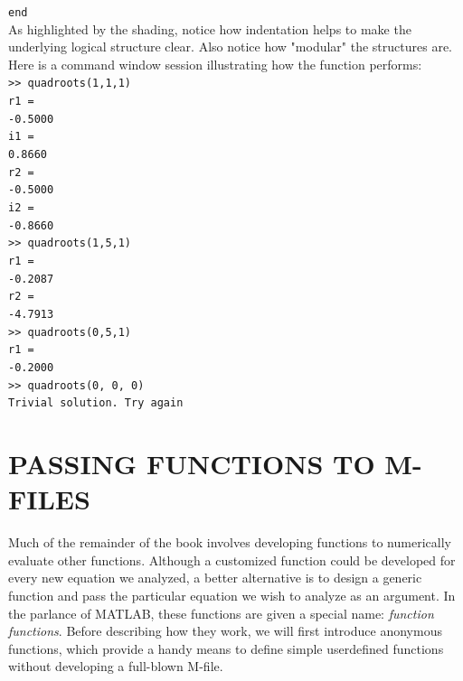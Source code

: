 \documentclass[../main.tex]{subfiles}
\begin{document}
\begin{example}
    \texttt{end}\\

    As highlighted by the shading, notice how indentation helps to make the underlying
logical structure clear. Also notice how "modular" the structures are. Here is a command
window session illustrating how the function performs:\\

\texttt{>> quadroots(1,1,1)\\
\indent r1 =\\
\indent \hspace{2mm}-0.5000\\
\indent i1 =\\
\indent \hspace{2mm}0.8660\\
\indent r2 =\\
\indent \hspace{2mm}-0.5000\\
\indent i2 =\\
\indent \hspace{2mm}-0.8660\\
\indent >> quadroots(1,5,1)\\
\indent r1 =\\
\indent \hspace{2mm}-0.2087\\
\indent r2 =\\
\indent \hspace{2mm}-4.7913\\
\indent >> quadroots(0,5,1)\\
\indent r1 =\\
\indent \hspace{2mm}-0.2000\\
\indent >> quadroots(0, 0, 0)\\
\indent Trivial solution. Try again}\\

\end{example}

\section{PASSING FUNCTIONS TO M-FILES}
\noindent
Much of the remainder of the book involves developing functions to numerically evaluate
other functions. Although a customized function could be developed for every new equation
we analyzed, a better alternative is to design a generic function and pass the particular
equation we wish to analyze as an argument. In the parlance of MATLAB, these functions
are given a special name: \emph{function functions}. Before describing how they work, we will
first introduce anonymous functions, which provide a handy means to define simple userdefined
functions without developing a full-blown M-file.\\
\end{document}
